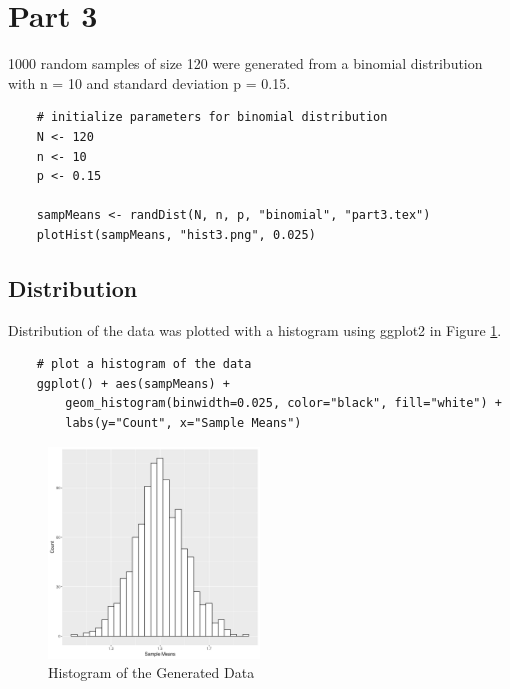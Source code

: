 \documentclass[paper=letter, fontsize=11pt]{article}
\begin{document}
    \section{Part 3}
        1000 random samples of size 120 were generated from a binomial distribution with n = 10 and standard deviation p = 0.15.

\begin{lstlisting}
    # initialize parameters for binomial distribution
    N <- 120
    n <- 10
    p <- 0.15

    sampMeans <- randDist(N, n, p, "binomial", "part3.tex")
    plotHist(sampMeans, "hist3.png", 0.025)
\end{lstlisting}

        

        \subsection{Distribution}
            Distribution of the data was plotted with a histogram using ggplot2 in Figure \ref{fig:hist3}.
\begin{lstlisting}
    # plot a histogram of the data
    ggplot() + aes(sampMeans) + 
        geom_histogram(binwidth=0.025, color="black", fill="white") +
        labs(y="Count", x="Sample Means")
\end{lstlisting}

            \begin{figure}[h!]
                \begin{center}
                    \includegraphics[width=0.5\textwidth]{figures/hist3.png}
                    \caption{Histogram of the Generated Data} \label{fig:hist3}
                \end{center}
            \end{figure}
\end{document}

